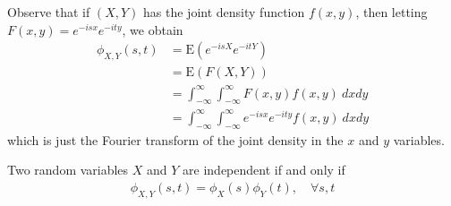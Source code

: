 Observe that if $(X, Y)$ has the joint density function $f(x, y)$, then
letting $F(x, y) = e^{-isx} e^{-ity}$, we obtain
\begin{equation*}
	\begin{split}
		\phi_{X,Y}(s,t) & = \mathrm{E}(e^{-isX} e^{-itY})
		\\
		& = \mathrm{E}(F(X, Y))
		\\
		& = \int_{-\infty}^{\infty}\int_{-\infty}^{\infty} F(x, y) f(x, y) \ dx  dy
		\\
		& = \int_{-\infty}^{\infty}\int_{-\infty}^{\infty} e^{-isx} e^{-ity}
		f(x, y) \ dx  dy
	\end{split}
\end{equation*}
which is just the Fourier transform of the joint density in the $x$ and $y$
variables.
\begin{lemma}\label{lem:char-ind}
	Two random variables $X$ and $Y$ are independent if and only if
	\begin{equation*}
		\begin{split}
			\phi_{X, Y}(s, t)= \phi_{X}(s) \phi_{Y}(t), \quad \forall s, t
		\end{split}
	\end{equation*}
\end{lemma}

